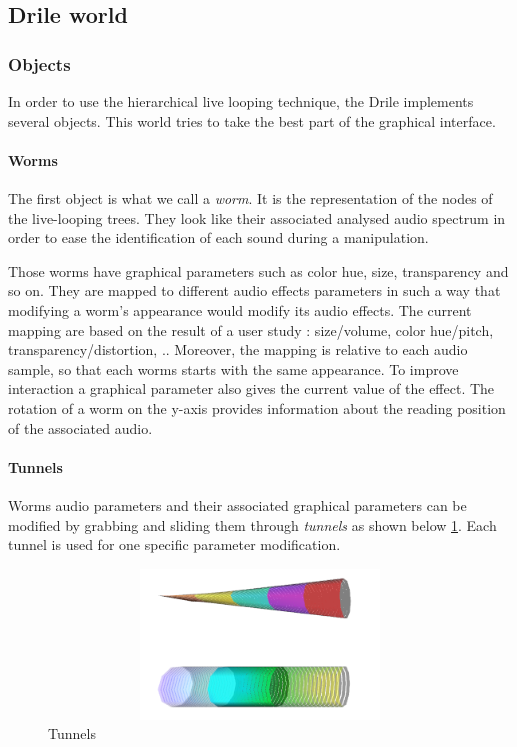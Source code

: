 \subsection{Drile world} 
 \subsubsection{Objects}
 In order to use the hierarchical live looping technique, the Drile implements several objects. This world tries to take the best part of the graphical interface.
\paragraph{Worms}    
 The first object is what we call a \textit{worm}. It is the representation of the nodes of the live-looping trees. They look like their associated analysed audio spectrum in order to ease the identification of each sound during a manipulation.
  
Those worms have graphical parameters such as color hue, size, transparency and so on. They are mapped to different audio effects parameters in such a way that modifying a worm's appearance would modify its audio effects. The current mapping are based on the result of a user study : size/volume, color hue/pitch, transparency/distortion, .. Moreover, the mapping is relative to each audio sample, so that each worms starts with the same appearance. To improve interaction a graphical parameter also gives the current value of the effect. The rotation of a worm on the y-axis provides information about the reading position of the associated audio.

\paragraph{Tunnels}    
Worms audio parameters and their associated graphical parameters can be modified by grabbing and sliding them through \textit{tunnels} as shown below \ref{fig:tunnel}. Each tunnel is used for one specific parameter modification.

\begin{figure}[h!]
\centering\includegraphics[width=14cm,height=4cm]{image/tunnels.png}
\caption{Tunnels}
\label{fig:tunnel}
\end{figure} 

